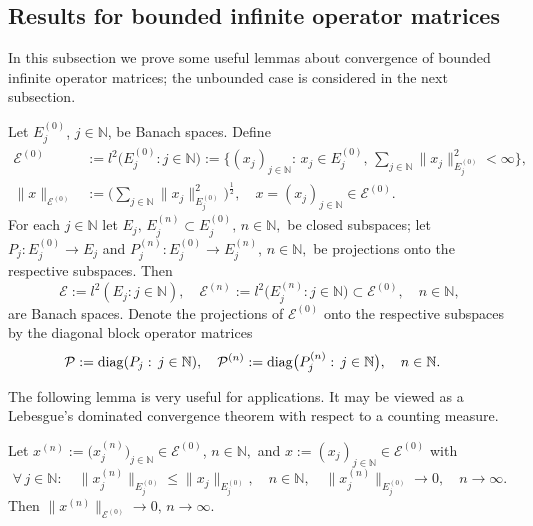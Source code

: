 \documentclass[a4paper,reqno]{amsart}
\begin{document}
\subsection{Results for bounded infinite operator matrices}\label{subsectionconvlemmas}
In this subsection we prove some useful lemmas about convergence of bounded infinite operator matrices;
the unbounded case is considered in the next subsection. 

\begin{definition}
Let $E_j^{(0)}$, $j\in{\mathbb{N}}$, be Banach spaces.  Define 
\begin{align*}
{\mathcal E}^{(0)}&:=l^2\big(E_j^{(0)}:j\in{\mathbb{N}}\big):=\bigg\{(x_j)_{j\in{\mathbb{N}}}:\, x_j\in E_j^{(0)},\,\sum_{j\in{\mathbb{N}}}\|x_j\|_{E_j^{(0)}}^2<\infty\bigg\},\\
\|x\|_{{\mathcal E}^{(0)}}&:=\bigg(\sum_{j\in{\mathbb{N}}}\|x_j\|_{E_j^{(0)}}^2\bigg)^{\frac{1}{2}}, \quad x=(x_j)_{j\in{\mathbb{N}}}\in{\mathcal E}^{(0)}.
\end{align*}
For each $j\in{\mathbb{N}}$ let $E_j,\,E_j^{(n)}\subset E_j^{(0)}, \,n\in{\mathbb{N}},$ be closed subspaces;
let  $P_j:E_j^{(0)}\to E_{j}$ and $P_j^{(n)}:E_j^{(0)}\to E_j^{(n)}, \,n\in{\mathbb{N}},$ be projections onto the respective subspaces.
Then  $${\mathcal E}:=l^2\left(E_{j}: j\in{\mathbb{N}}\right), \quad {\mathcal E}^{(n)}:=l^2\big(E_j^{(n)}: j\in{\mathbb{N}}\big)\subset {\mathcal E}^{(0)}, \quad n\in{\mathbb{N}},$$ are Banach spaces. 
Denote the projections of ${\mathcal E}^{(0)}$ onto the respective subspaces
by the diagonal block operator matrices
\begin{align*} {\mathcal P}&:={{\rm diag} }(P_{j}:\,j\in{\mathbb{N}}), \quad {\mathcal P}^{(n)}:={{\rm diag} }\big(P_j^{(n)}:\,j\in{\mathbb{N}}\big), \quad n\in{\mathbb{N}}.\end{align*}
\end{definition}

The following lemma is very useful for applications. It may be viewed as a Lebesgue's dominated convergence theorem  with respect to a counting measure. 

\begin{lemma} \label{domconv}
Let $x^{(n)}:=\big(x_j^{(n)}\big)_{j\in{\mathbb{N}}}\in {\mathcal E}^{(0)}$, $n\in{\mathbb{N}},$
and $x:=(x_j)_{j\in{\mathbb{N}}}\in{\mathcal E}^{(0)}$ with
\begin{equation} \forall\,j\in{\mathbb{N}}:\quad 
\big\|x_j^{(n)}\big\|_{E_j^{(0)}}\leq \|x_j\|_{E_j^{(0)}}, \quad n\in{\mathbb{N}},\quad \big\|x_j^{(n)}\big\|_{E_j^{(0)}}{\longrightarrow} 0, \quad n\to\infty.\label{eqconvofentries}\end{equation} 
Then $\big\|x^{(n)}\big\|_{{\mathcal E}^{(0)}}\to 0, \,n\to\infty.$ 
\end{lemma}
\end{document}
